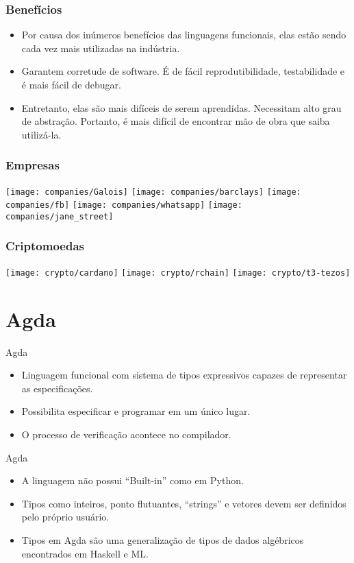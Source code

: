 \documentclass{beamer}
\begin{document}
\begin{frame}
  \frametitle{Benefícios}
  \begin{itemize}
    \item Por causa dos inúmeros benefícios das linguagens funcionais,
      elas estão sendo cada vez mais utilizadas na indústria.
    \item Garantem corretude de software.
      É de fácil reprodutibilidade, testabilidade e é mais fácil de debugar.
    \item Entretanto, elas são mais difíceis de serem aprendidas.
      Necessitam alto grau de abstração.
      Portanto, é mais difícil de encontrar mão de obra que saiba utilizá-la.
  \end{itemize}
\end{frame}

\begin{frame}
  \frametitle{Empresas}
    \texttt{[image: companies/Galois]}
    \texttt{[image: companies/barclays]}
    \texttt{[image: companies/fb]}
    \texttt{[image: companies/whatsapp]}
    \texttt{[image: companies/jane\_street]}
\end{frame}

\begin{frame}
  \frametitle{Criptomoedas}
    \texttt{[image: crypto/cardano]}
    \texttt{[image: crypto/rchain]}
    \texttt{[image: crypto/t3-tezos]}
\end{frame}
 
\section{Agda}

 \begin{frame}{Agda}
 \begin{itemize}
    \item Linguagem funcional com sistema de tipos expressivos capazes de representar as especificações.
    \item Possibilita especificar e programar em um único lugar.
    \item O processo de verificação acontece no compilador.
 \end{itemize}
 \end{frame}
 
 \begin{frame}{Agda}
 \begin{itemize}
     \item A linguagem não possui \foreignquote{english}{Built-in} como em Python.
     \item Tipos como inteiros, ponto flutuantes, \foreignquote{english}{strings} e vetores devem ser definidos pelo próprio usuário.
     \item Tipos em Agda são uma generalização de tipos de dados algébricos encontrados em Haskell e ML.
 \end{itemize}
 \end{frame}
\end{document}
